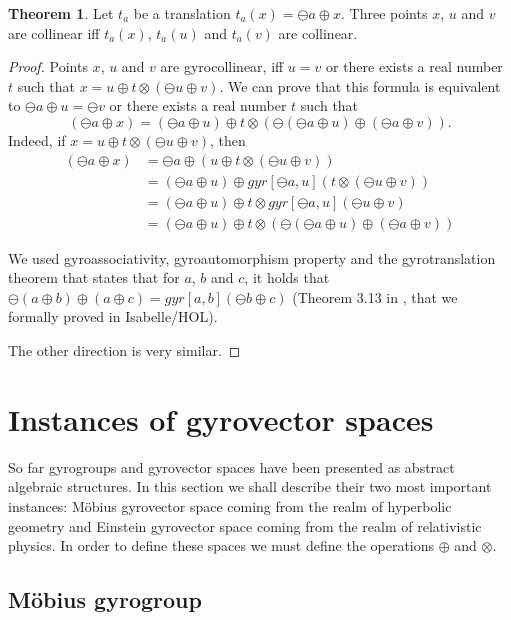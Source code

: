 \documentclass[a4paper]{article}
\theoremstyle{definition}
\newtheorem{theorem}{Theorem}[section]
\begin{document}
\begin{theorem}
  Let $t_a$ be a translation $t_a(x) = \ominus a \oplus x$. Three
  points $x$, $u$ and $v$ are collinear iff $t_a(x)$, $t_a(u)$ and
  $t_a(v)$ are collinear.
\end{theorem}
\begin{proof} Points $x$, $u$ and $v$ are gyrocollinear, iff $u=v$ or
  there exists a real number $t$ such that
  $x=u\oplus t\otimes (\ominus u \oplus v)$. We can prove that this
  formula is equivalent to $\ominus a \oplus u = \ominus v$ or there
  exists a real number $t$ such that
  $$(\ominus a \oplus x) = (\ominus a \oplus u) \oplus t \otimes
  (\ominus (\ominus a \oplus u) \oplus (\ominus a \oplus v)).$$
  Indeed, if $x=u\oplus t\otimes (\ominus u \oplus v)$, then
\begin{align*} 
(\ominus a \oplus x) &=  \ominus a \oplus (u\oplus t \otimes (\ominus u \oplus v)) \\ 
 &=  (\ominus a \oplus u) \oplus gyr [\ominus a, u] (t\otimes (\ominus u \oplus v))\\
 &= (\ominus a \oplus u) \oplus t \otimes gyr [\ominus a, u] (\ominus u \oplus v)\\
 &= (\ominus a \oplus u) \oplus t \otimes (\ominus (\ominus a \oplus u) \oplus (\ominus a \oplus v))
\end{align*}

We used gyroassociativity, gyroautomorphism property and the
gyrotranslation theorem that states that for $a$, $b$ and $c$, it
holds that
$\ominus (a \oplus b) \oplus (a \oplus c) = gyr[a, b] (\ominus b
\oplus c)$ (Theorem 3.13 in \cite{ungar-analytic}, that we formally
proved in Isabelle/HOL).

The other direction is very similar.
\end{proof}


\section{Instances of gyrovector spaces}\label{sec:mobiuseinstein}

So far gyrogroups and gyrovector spaces have been presented as
abstract algebraic structures. In this section we shall describe their
two most important instances: M\"obius gyrovector space coming from
the realm of hyperbolic geometry and Einstein gyrovector space coming
from the realm of relativistic physics. In order to define these
spaces we must define the operations $\oplus$ and $\otimes$.


\subsection{M\"obius gyrogroup}\label{sec:mobiusgyrogroup}
\end{document}
